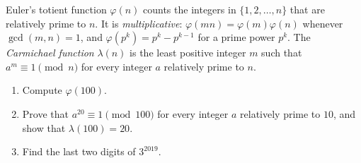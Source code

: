 Euler's totient function $\varphi(n)$ counts the integers in $\{1,2,\dots,n\}$ that are relatively prime to $n$. It is \emph{multiplicative}: $\varphi(mn)=\varphi(m)\varphi(n)$ whenever $\gcd(m,n)=1$, and $\varphi(p^k)=p^k-p^{k-1}$ for a prime power $p^k$. The \emph{Carmichael function} $\lambda(n)$ is the least positive integer $m$ such that $a^m\equiv1\pmod n$ for every integer $a$ relatively prime to $n$.
\begin{enumerate}
\item[(a)] Compute $\varphi(100)$.
\item[(b)] Prove that $a^{20}\equiv1\pmod{100}$ for every integer $a$ relatively prime to $10$, and show that $\lambda(100)=20$.
\item[(c)] Find the last two digits of $3^{2019}$.
\end{enumerate}
